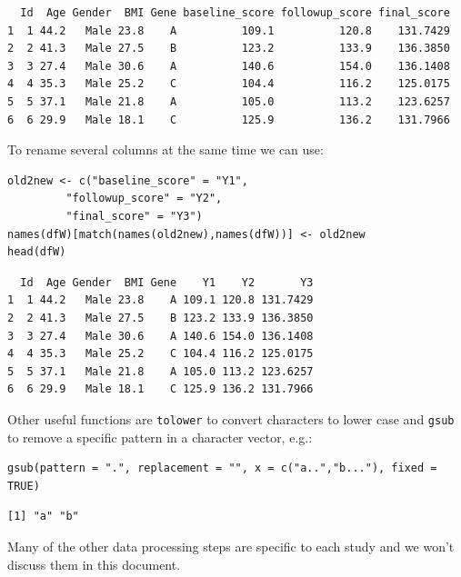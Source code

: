 \documentclass[12pt]{article}
\begin{document}
\begin{verbatim}
  Id  Age Gender  BMI Gene baseline_score followup_score final_score
1  1 44.2   Male 23.8    A          109.1          120.8    131.7429
2  2 41.3   Male 27.5    B          123.2          133.9    136.3850
3  3 27.4   Male 30.6    A          140.6          154.0    136.1408
4  4 35.3   Male 25.2    C          104.4          116.2    125.0175
5  5 37.1   Male 21.8    A          105.0          113.2    123.6257
6  6 29.9   Male 18.1    C          125.9          136.2    131.7966
\end{verbatim}

To rename several columns at the same time we can use:
\lstset{language=r,label= ,caption= ,captionpos=b,numbers=none}
\begin{lstlisting}
old2new <- c("baseline_score" = "Y1", 
	     "followup_score" = "Y2",
	     "final_score" = "Y3")
names(dfW)[match(names(old2new),names(dfW))] <- old2new
head(dfW)
\end{lstlisting}

\begin{verbatim}
  Id  Age Gender  BMI Gene    Y1    Y2       Y3
1  1 44.2   Male 23.8    A 109.1 120.8 131.7429
2  2 41.3   Male 27.5    B 123.2 133.9 136.3850
3  3 27.4   Male 30.6    A 140.6 154.0 136.1408
4  4 35.3   Male 25.2    C 104.4 116.2 125.0175
5  5 37.1   Male 21.8    A 105.0 113.2 123.6257
6  6 29.9   Male 18.1    C 125.9 136.2 131.7966
\end{verbatim}

Other useful functions are \texttt{tolower} to convert characters to lower
case and \texttt{gsub} to remove a specific pattern in a character vector, e.g.:
\lstset{language=r,label= ,caption= ,captionpos=b,numbers=none}
\begin{lstlisting}
gsub(pattern = ".", replacement = "", x = c("a..","b..."), fixed = TRUE)
\end{lstlisting}

\begin{verbatim}
[1] "a" "b"
\end{verbatim}

Many of the other data processing steps are specific to each study and
we won't discuss them in this document. 
\end{document}
